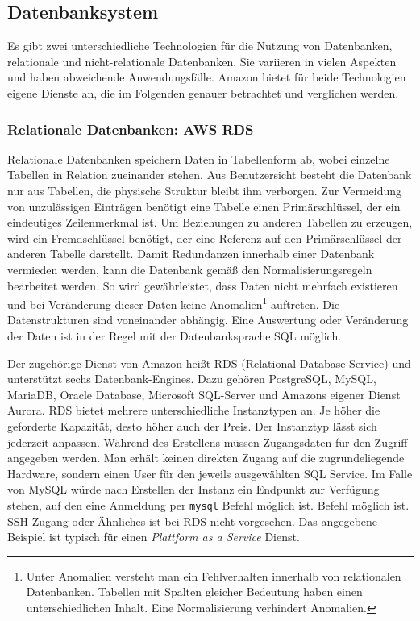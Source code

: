 \subsection{Datenbanksystem}
Es gibt zwei unterschiedliche Technologien für die Nutzung von Datenbanken, relationale und nicht-relationale Datenbanken.
Sie variieren in vielen Aspekten und haben abweichende Anwendungsfälle.
Amazon bietet für beide Technologien eigene Dienste an, die im Folgenden genauer betrachtet und verglichen werden.

\clearpage
\subsubsection{Relationale Datenbanken: AWS RDS}

Relationale Datenbanken speichern Daten in Tabellenform ab, wobei einzelne Tabellen in Relation zueinander stehen.
Aus Benutzersicht besteht die Datenbank nur aus Tabellen, die physische Struktur bleibt ihm verborgen.
Zur Vermeidung von unzulässigen Einträgen benötigt eine Tabelle einen Primärschlüssel, der ein eindeutiges Zeilenmerkmal ist.
Um Beziehungen zu anderen Tabellen zu erzeugen, wird ein Fremdschlüssel benötigt, der eine Referenz auf den Primärschlüssel der anderen Tabelle darstellt.
Damit Redundanzen innerhalb einer Datenbank vermieden werden, kann die Datenbank gemäß den Normalisierungsregeln bearbeitet werden.
So wird gewährleistet, dass Daten nicht mehrfach existieren und bei Veränderung dieser Daten keine Anomalien\footnote{Unter Anomalien versteht man ein Fehlverhalten innerhalb von relationalen Datenbanken. Tabellen
mit Spalten gleicher Bedeutung haben einen unterschiedlichen Inhalt. Eine Normalisierung verhindert Anomalien. } auftreten.
Die Datenstrukturen sind voneinander abhängig. Eine Auswertung oder Veränderung der Daten ist in der Regel mit der Datenbanksprache SQL möglich. \cite{Datenbankvergleich}

Der zugehörige Dienst von Amazon heißt RDS (Relational Database Service) und unterstützt sechs Datenbank-Engines. Dazu gehören
PostgreSQL, MySQL, MariaDB, Oracle Database, Microsoft SQL-Server und Amazons eigener Dienst Aurora.
RDS bietet mehrere unterschiedliche Instanztypen an.
Je höher die geforderte Kapazität, desto höher auch der Preis.
Der Instanztyp lässt sich jederzeit anpassen.
Während des Erstellens müssen Zugangsdaten für den Zugriff angegeben werden.
Man erhält keinen direkten Zugang auf die zugrundeliegende Hardware, sondern einen User für den jeweils ausgewählten SQL Service.
Im Falle von MySQL würde nach Erstellen der Instanz ein Endpunkt zur Verfügung stehen, auf den eine Anmeldung per \verb+mysql+ Befehl möglich ist.
Befehl möglich ist. SSH-Zugang oder Ähnliches ist bei RDS nicht vorgesehen.
Das angegebene Beispiel ist typisch für einen \textsl{Plattform as a Service} Dienst.

